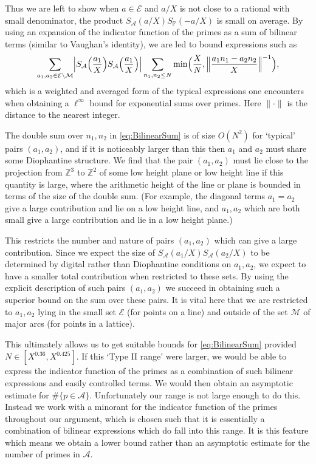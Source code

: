 \documentclass[10pt]{amsart}
\theoremstyle{plain}
\numberwithin{sblmm}{thrm}
\numberwithin{equation}{section}
\begin{document}
Thus we are left to show when $a\in\mathcal{E}$ and $a/X$ is not close to a rational with small denominator, the product $S_{\mathcal{A}}(a/X)S_{\mathbb{P}}(-a/X)$ is small on average. By using an expansion of the indicator function of the primes as a sum of bilinear terms (similar to Vaughan's identity), we are led to bound expressions such as
%
\begin{equation}
\sum_{a_1,a_2\in\mathcal{E}\backslash\mathcal{M}}\Bigl|S_{\mathcal{A}}\Bigl(\frac{a_1}{X}\Bigr)S_{\mathcal{A}}\Bigl(\frac{a_1}{X}\Bigr)\Bigr|\sum_{n_1,n_2\le N}\min\Bigl(\frac{X}{N},\Bigl\|\frac{a_1n_1-a_2n_2}{X}\Bigr\|^{-1}\Bigr),\label{eq:BilinearSum}
\end{equation}
%
which is a weighted and averaged form of the typical expressions one encounters when obtaining a $\ell^\infty$ bound for exponential sums over primes. Here $\|\cdot\|$ is the distance to the nearest integer.

The double sum over $n_1,n_2$ in \eqref{eq:BilinearSum} is of size $O(N^2)$ for `typical' pairs $(a_1,a_2)$, and if it is noticeably larger than this then $a_1$ and $a_2$ must share some Diophantine structure. We find that the pair $(a_1,a_2)$ must lie close to the projection from $\mathbb{Z}^3$ to $\mathbb{Z}^2$ of some low height plane or low height line if this quantity is large, where the arithmetic height of the line or plane is bounded in terms of the size of the double sum. (For example, the diagonal terms $a_1=a_2$ give a large contribution and lie on a low height line, and $a_1,a_2$ which are both small give a large contribution and lie in a low height plane.)

This restricts the number and nature of pairs $(a_1,a_2)$ which can give a large contribution. Since we expect the size of $S_{\mathcal{A}}(a_1/X)S_{\mathcal{A}}(a_2/X)$ to be determined by digital rather than Diophantine conditions on $a_1,a_2$, we expect to have a smaller total contribution when restricted to these sets. By using the explicit description of such pairs $(a_1,a_2)$ we succeed in obtaining such a superior bound on the sum over these pairs. It is vital here that we are restricted to $a_1,a_2$ lying in the small set $\mathcal{E}$ (for points on a line) and outside of the set $\mathcal{M}$ of major arcs (for points in a lattice).

This ultimately allows us to get suitable bounds for \eqref{eq:BilinearSum} provided $N\in[X^{0.36},X^{0.425}]$. If this `Type II range' were larger, we would be able to express the indicator function of the primes as a combination of such bilinear expressions and easily controlled terms. We would then obtain an asymptotic estimate for $\#\{p\in\mathcal{A}\}$. Unfortunately our range is not large enough to do this. Instead we work with a minorant for the indicator function of the primes throughout our argument, which is chosen such that it is essentially a combination of bilinear expressions which do fall into this range. It is this feature which means we obtain a lower bound rather than an asymptotic estimate for the number of primes in $\mathcal{A}$.
\end{document}
